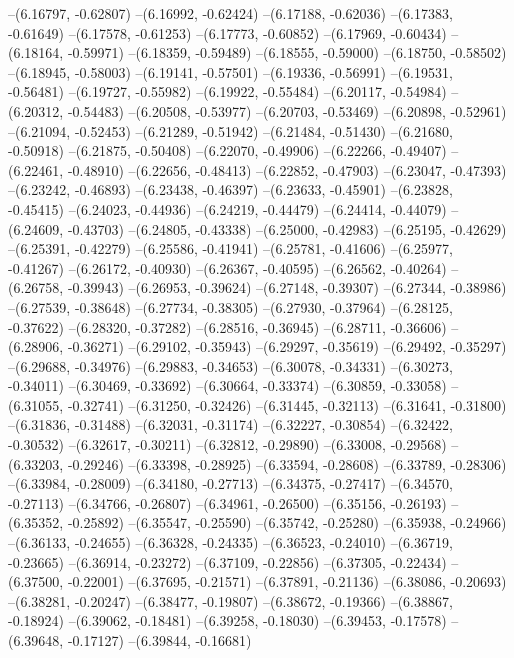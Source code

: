 --(6.16797, -0.62807)
--(6.16992, -0.62424)
--(6.17188, -0.62036)
--(6.17383, -0.61649)
--(6.17578, -0.61253)
--(6.17773, -0.60852)
--(6.17969, -0.60434)
--(6.18164, -0.59971)
--(6.18359, -0.59489)
--(6.18555, -0.59000)
--(6.18750, -0.58502)
--(6.18945, -0.58003)
--(6.19141, -0.57501)
--(6.19336, -0.56991)
--(6.19531, -0.56481)
--(6.19727, -0.55982)
--(6.19922, -0.55484)
--(6.20117, -0.54984)
--(6.20312, -0.54483)
--(6.20508, -0.53977)
--(6.20703, -0.53469)
--(6.20898, -0.52961)
--(6.21094, -0.52453)
--(6.21289, -0.51942)
--(6.21484, -0.51430)
--(6.21680, -0.50918)
--(6.21875, -0.50408)
--(6.22070, -0.49906)
--(6.22266, -0.49407)
--(6.22461, -0.48910)
--(6.22656, -0.48413)
--(6.22852, -0.47903)
--(6.23047, -0.47393)
--(6.23242, -0.46893)
--(6.23438, -0.46397)
--(6.23633, -0.45901)
--(6.23828, -0.45415)
--(6.24023, -0.44936)
--(6.24219, -0.44479)
--(6.24414, -0.44079)
--(6.24609, -0.43703)
--(6.24805, -0.43338)
--(6.25000, -0.42983)
--(6.25195, -0.42629)
--(6.25391, -0.42279)
--(6.25586, -0.41941)
--(6.25781, -0.41606)
--(6.25977, -0.41267)
--(6.26172, -0.40930)
--(6.26367, -0.40595)
--(6.26562, -0.40264)
--(6.26758, -0.39943)
--(6.26953, -0.39624)
--(6.27148, -0.39307)
--(6.27344, -0.38986)
--(6.27539, -0.38648)
--(6.27734, -0.38305)
--(6.27930, -0.37964)
--(6.28125, -0.37622)
--(6.28320, -0.37282)
--(6.28516, -0.36945)
--(6.28711, -0.36606)
--(6.28906, -0.36271)
--(6.29102, -0.35943)
--(6.29297, -0.35619)
--(6.29492, -0.35297)
--(6.29688, -0.34976)
--(6.29883, -0.34653)
--(6.30078, -0.34331)
--(6.30273, -0.34011)
--(6.30469, -0.33692)
--(6.30664, -0.33374)
--(6.30859, -0.33058)
--(6.31055, -0.32741)
--(6.31250, -0.32426)
--(6.31445, -0.32113)
--(6.31641, -0.31800)
--(6.31836, -0.31488)
--(6.32031, -0.31174)
--(6.32227, -0.30854)
--(6.32422, -0.30532)
--(6.32617, -0.30211)
--(6.32812, -0.29890)
--(6.33008, -0.29568)
--(6.33203, -0.29246)
--(6.33398, -0.28925)
--(6.33594, -0.28608)
--(6.33789, -0.28306)
--(6.33984, -0.28009)
--(6.34180, -0.27713)
--(6.34375, -0.27417)
--(6.34570, -0.27113)
--(6.34766, -0.26807)
--(6.34961, -0.26500)
--(6.35156, -0.26193)
--(6.35352, -0.25892)
--(6.35547, -0.25590)
--(6.35742, -0.25280)
--(6.35938, -0.24966)
--(6.36133, -0.24655)
--(6.36328, -0.24335)
--(6.36523, -0.24010)
--(6.36719, -0.23665)
--(6.36914, -0.23272)
--(6.37109, -0.22856)
--(6.37305, -0.22434)
--(6.37500, -0.22001)
--(6.37695, -0.21571)
--(6.37891, -0.21136)
--(6.38086, -0.20693)
--(6.38281, -0.20247)
--(6.38477, -0.19807)
--(6.38672, -0.19366)
--(6.38867, -0.18924)
--(6.39062, -0.18481)
--(6.39258, -0.18030)
--(6.39453, -0.17578)
--(6.39648, -0.17127)
--(6.39844, -0.16681)
